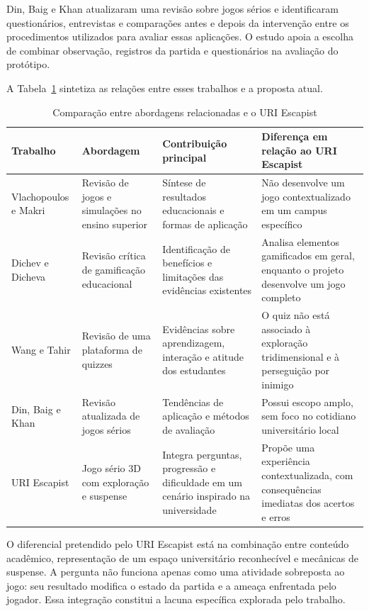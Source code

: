 \documentclass[12pt]{article}
\begin{document}
Din, Baig e Khan \cite{din2023} atualizaram uma revisão sobre jogos sérios e identificaram questionários, entrevistas e comparações antes e depois da intervenção entre os procedimentos utilizados para avaliar essas aplicações. O estudo apoia a escolha de combinar observação, registros da partida e questionários na avaliação do protótipo.

A Tabela~\ref{tab:comparacao} sintetiza as relações entre esses trabalhos e a proposta atual.

\begin{table}[H]
\centering
\caption{Comparação entre abordagens relacionadas e o URI Escapist}
\label{tab:comparacao}
\small
\begin{tabularx}{\textwidth}{p{2.7cm}X X X}
\toprule
\textbf{Trabalho} & \textbf{Abordagem} & \textbf{Contribuição principal} & \textbf{Diferença em relação ao URI Escapist} \\
\midrule
Vlachopoulos e Makri \cite{vlachopoulos2017} & Revisão de jogos e simulações no ensino superior & Síntese de resultados educacionais e formas de aplicação & Não desenvolve um jogo contextualizado em um campus específico \\
\addlinespace
Dichev e Dicheva \cite{dichev2017} & Revisão crítica de gamificação educacional & Identificação de benefícios e limitações das evidências existentes & Analisa elementos gamificados em geral, enquanto o projeto desenvolve um jogo completo \\
\addlinespace
Wang e Tahir \cite{wang2020} & Revisão de uma plataforma de quizzes & Evidências sobre aprendizagem, interação e atitude dos estudantes & O quiz não está associado à exploração tridimensional e à perseguição por inimigo \\
\addlinespace
Din, Baig e Khan \cite{din2023} & Revisão atualizada de jogos sérios & Tendências de aplicação e métodos de avaliação & Possui escopo amplo, sem foco no cotidiano universitário local \\
\addlinespace
URI Escapist & Jogo sério 3D com exploração e suspense & Integra perguntas, progressão e dificuldade em um cenário inspirado na universidade & Propõe uma experiência contextualizada, com consequências imediatas dos acertos e erros \\
\bottomrule
\end{tabularx}
\end{table}

O diferencial pretendido pelo URI Escapist está na combinação entre conteúdo acadêmico, representação de um espaço universitário reconhecível e mecânicas de suspense. A pergunta não funciona apenas como uma atividade sobreposta ao jogo: seu resultado modifica o estado da partida e a ameaça enfrentada pelo jogador. Essa integração constitui a lacuna específica explorada pelo trabalho.
\end{document}
